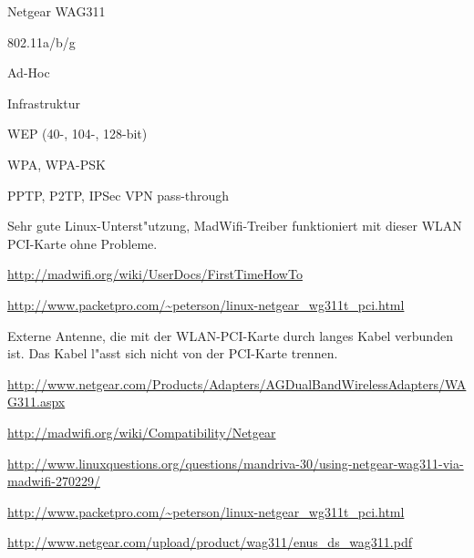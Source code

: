 %
%
\begin{wlandevice}{Netgear WAG311}



\begin{wlanieeestandard}
\item 802.11a/b/g
\end{wlanieeestandard}

\begin{wlanmode}
\item Ad-Hoc
\item Infrastruktur
\end{wlanmode}

\begin{wlansecurity}
\item WEP (40-, 104-, 128-bit)
\item WPA, WPA-PSK
\item PPTP, P2TP, IPSec VPN pass-through
\end{wlansecurity}

\begin{wlandriver}
\item
Sehr gute Linux-Unterst"utzung, MadWifi-Treiber funktioniert
mit dieser WLAN PCI-Karte ohne Probleme.
\end{wlandriver}


\begin{wlaninstall}
\item
\url{http://madwifi.org/wiki/UserDocs/FirstTimeHowTo}

\url{http://www.packetpro.com/~peterson/linux-netgear_wg311t_pci.html}
\end{wlaninstall}

\begin{wlanextrainfo}
\item
Externe Antenne, die mit der WLAN-PCI-Karte durch langes Kabel verbunden ist.
Das Kabel l"asst sich nicht von der PCI-Karte trennen.
\end{wlanextrainfo}

\begin{wlanlink}
\item \url{http://www.netgear.com/Products/Adapters/AGDualBandWirelessAdapters/WAG311.aspx}
\item \url{http://madwifi.org/wiki/Compatibility/Netgear}
\item \url{http://www.linuxquestions.org/questions/mandriva-30/using-netgear-wag311-via-madwifi-270229/}
\item \url{http://www.packetpro.com/~peterson/linux-netgear_wg311t_pci.html}
\item \url{http://www.netgear.com/upload/product/wag311/enus_ds_wag311.pdf}
\end{wlanlink}

\end{wlandevice}


